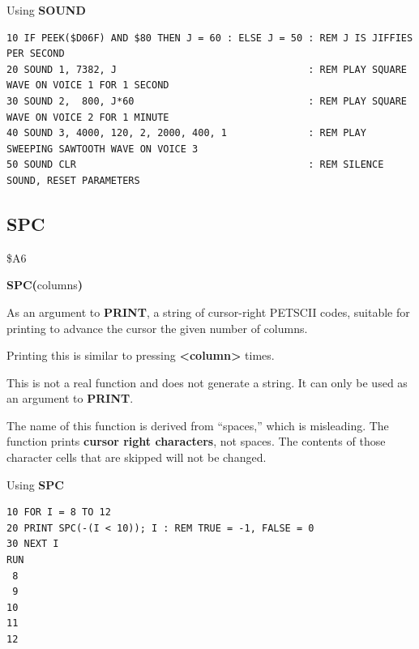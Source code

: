 \begin{description}[leftmargin=2cm,style=nextline]
\item [Example:]  Using {\bf SOUND}

\begin{tcolorbox}[colback=black,coltext=white]
\verbatimfont{\codefont}
\begin{verbatim}
10 IF PEEK($D06F) AND $80 THEN J = 60 : ELSE J = 50 : REM J IS JIFFIES PER SECOND
20 SOUND 1, 7382, J                                 : REM PLAY SQUARE WAVE ON VOICE 1 FOR 1 SECOND
30 SOUND 2,  800, J*60                              : REM PLAY SQUARE WAVE ON VOICE 2 FOR 1 MINUTE
40 SOUND 3, 4000, 120, 2, 2000, 400, 1              : REM PLAY SWEEPING SAWTOOTH WAVE ON VOICE 3
50 SOUND CLR                                        : REM SILENCE SOUND, RESET PARAMETERS
\end{verbatim}
\end{tcolorbox}
\end{description}


\newpage
\subsection{SPC}
\begin{description}[leftmargin=2cm,style=nextline]
\item [Token:]    \$A6

\item [Format:]   {\bf SPC(}columns{\bf)}

\item [Returns:]  As an argument to {\bf PRINT}, a string of cursor-right PETSCII codes, suitable for printing to advance the cursor the given number of columns.

                  Printing this is similar to pressing \megakey{$\rightarrow$} {\bf <column>} times.

                  This is not a real function and does not generate a string. It can only be used as an argument to {\bf PRINT}.

\item [Remarks:]  The name of this function is derived from ``spaces,'' which is misleading. The function prints {\bf cursor right characters}, not spaces. The contents of those character cells that are skipped will not be changed.

\item [Example:]  Using {\bf SPC}

\begin{tcolorbox}[colback=black,coltext=white]
\verbatimfont{\codefont}
\begin{verbatim}
10 FOR I = 8 TO 12
20 PRINT SPC(-(I < 10)); I : REM TRUE = -1, FALSE = 0
30 NEXT I
RUN
 8
 9
10
11
12
\end{verbatim}
\end{tcolorbox}
\end{description}

